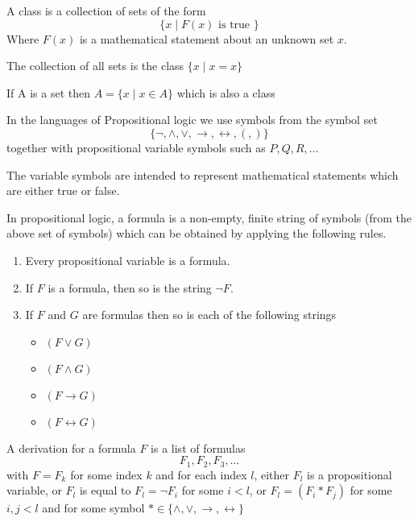



\begin{defn}
A class is a collection of sets of the form $$\{x\mid F(x) \text{ is true }\}$$
Where $F(x)$ is a mathematical statement about an unknown set $x$.
\end{defn}

\begin{exmp}
The collection of all sets is the class $\{x\mid x=x\}$
\end{exmp}

\begin{exmp}
If A is a set then $A = \{x\mid x\in A\}$ which is also a class
\end{exmp}


\begin{defn}
In the languages of Propositional logic we use symbols from the symbol set
$$\{\neg,\wedge,\vee,\to,\leftrightarrow ,(,)\}$$
together with propositional variable symbols such as $P,Q,R,\dots$

The variable symbols are intended to represent mathematical statements which are either true or false.


In propositional logic, a formula is a non-empty, finite string of symbols (from the above set of symbols) which can be obtained by applying the following rules.

\begin{enumerate}
\item Every propositional variable is a formula.
\item If $F$ is a formula, then so is the string $\neg F$.
\item If $F$ and $G$ are formulas then so is each of the following strings
    \begin{itemize}
        \item $(F\vee G)$
        \item $(F\wedge G)$
        \item $(F\to G)$
        \item $(F\leftrightarrow G)$
    \end{itemize}
\end{enumerate}

A derivation for a formula $F$ is a list of formulas $$F_1,F_2,F_3,\dots$$ with $F=F_k$ for some index $k$ and for each index $l$, either $F_l$ is a propositional variable, or $F_l$ is equal to $F_l=\neg F_i$ for some $i<l$, or $F_l=(F_i \ast F_j)$ for some $i,j<l$ and for some symbol $\ast \in \{\wedge,\vee,\to,\leftrightarrow\}$

\end{defn}

